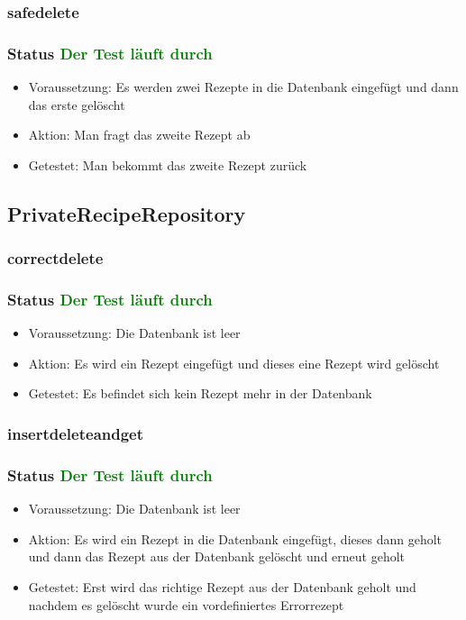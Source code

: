 \subsubsection{safedelete}
\subsubsection{Status \textcolor{green}{ Der Test läuft durch} }
\begin{itemize}
	\item Voraussetzung: Es werden zwei Rezepte in die Datenbank eingefügt und dann das erste gelöscht
	\item Aktion: Man fragt das zweite Rezept ab
	\item Getestet: Man bekommt das zweite Rezept zurück
\end{itemize}


\subsection{PrivateRecipeRepository}

\subsubsection{correctdelete}
\subsubsection{Status \textcolor{green}{ Der Test läuft durch} }
\begin{itemize}
	\item Voraussetzung: Die Datenbank ist leer
	\item Aktion: Es wird ein Rezept eingefügt und dieses eine Rezept wird gelöscht
	\item Getestet: Es befindet sich kein Rezept mehr in der Datenbank
\end{itemize}


\subsubsection{insertdeleteandget}
\subsubsection{Status \textcolor{green}{ Der Test läuft durch} }
\begin{itemize}
	\item Voraussetzung: Die Datenbank ist leer
	\item Aktion: Es wird ein Rezept in die Datenbank eingefügt, dieses dann geholt und dann das Rezept aus der Datenbank gelöscht und erneut geholt
	\item Getestet: Erst wird das richtige Rezept aus der Datenbank geholt und nachdem es gelöscht wurde ein vordefiniertes Errorrezept
\end{itemize}


